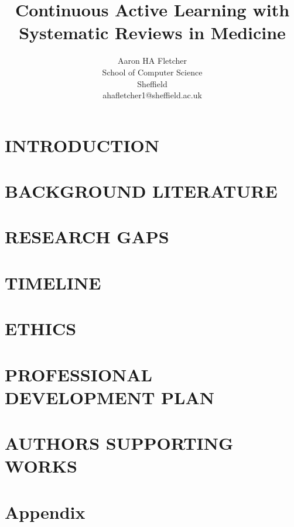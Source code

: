\documentclass[10pt, english]{article}
\title{\textbf{Continuous Active Learning with Systematic Reviews in Medicine}}
\author{
    \fontsize{11}{13}\selectfont 
    Aaron HA Fletcher \\
    \fontsize{10}{11}\selectfont 
     School of Computer Science\\
    \fontsize{10}{11}\selectfont 
    Sheffield\\
    \fontsize{10}{11}\selectfont
    ahafletcher1@sheffield.ac.uk\\
}
\date{}
\begin{document}
\renewcommand{\abstractname}{} %
\maketitle %
\newpage


\newpage


\setlength{\absleftindent}{0em}
\setlength{\absrightindent}{0em}

\begin{abstract}
\newpage 
    \abstractText %
\end{abstract}
\newpage
\tableofcontents
\newpage
\newcommand{\lightshadowbox}[1]{%
  \setlength{\fboxsep}{6pt}%
  \setlength{\shadowsize}{1pt}%
  \shadowbox{#1}%
}

\newpage
\section{INTRODUCTION}


\newpage
\section{BACKGROUND LITERATURE}

\newpage


\newpage

\newpage




\newpage

\newpage
\newpage
\section{RESEARCH GAPS}

\newpage
\section{TIMELINE}

\newpage
\section{ETHICS}

\newpage
\section{PROFESSIONAL DEVELOPMENT PLAN}

\newpage
\section{AUTHORS SUPPORTING WORKS}

\newpage

\newpage
\section{Appendix}

\printbibliography
\end{document}
